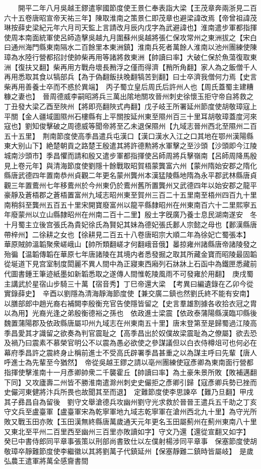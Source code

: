 　　開平二年八月吳越王鏐遣寧國節度使王景仁奉表詣大梁【王茂章奔兩浙見二百六十五卷唐昭宣帝天祐三年】陳取淮南之策景仁即茂章也避梁諱改焉【帝曾祖諱茂琳按薛史梁紀元年六月司天監上言請改月辰内戊字為武避諱也】淮南遣步軍都指揮使周本南面統軍使呂師造擊吳越九月圍蘇州吳越將張仁保攻常州之東洲拔之【宋白曰通州海門縣東南隔水二百餘里本東洲鎮】淮南兵死者萬餘人淮南以池州團練使陳璋為水陸行營都招討使帥柴再用等諸將救東洲【帥讀曰率】大破仁保於魚蕩復取東洲【復扶又翻】柴再用方戰舟壞長矟浮之僅而得濟【矟所角翻】家人為之飯僧千人再用悉取其食以犒部兵【為于偽翻飯扶晚翻犒苦到翻】曰士卒濟我僧何力焉【史言柴再用善養士卒而不惑於異端】　丙子蜀立皇后周氏后許州人也【周氏蓋蜀主建糟糠之妻也】　晉周德威李嗣昭將兵三萬出隂地關攻晉州刺史徐懷玉拒守帝自將救之丁丑發大梁乙酉至陜州【將即亮翻陜式冉翻】戊子岐王所署延州節度使胡敬璋寇上平關【金人疆域圖隰州石樓縣有上平關按延州東至隰州百三十里耳胡敬璋蓋度河來寇也】劉知俊擊破之周德威等聞帝將至乙未退保隰州【九域志晉州西北至隰州二百五十五里】　荆南節度使高季昌遣兵屯漢口【漢口漢水入江之口其地在鄂州漢陽縣東大别山下】絶楚朝貢之路楚王殷遣其將許德勲將水軍擊之至沙頭【沙頭即今江陵城南沙頭市】季昌懼而請和殷又遣步軍都指揮使呂師周將兵擊嶺南【呂師周降馬殷見上卷元年】與清海節度使劉隱十餘戰取昭賀梧蒙龔富六州【蒙州隋始安郡之隋化縣唐武德四年置南恭州貞觀二年更名蒙州龔州本漢猛陵縣地隋為永平郡武林縣唐貞觀三年置鷰州七年移鷰州於今州東仍於鷰州舊所置龔州又武德四年以始安郡之龍平豪靜及蒼梧郡之蒼梧置富州九域志昭州東至賀州三百二十五里南至梧州四百九十里南稍斜至龔州五百五十里宋開寶廢富州以龍平縣隸昭州在州東南百六十二里熙寧五年廢蒙州以立山縣隸昭州在州南二百十二里】殷土字旣廣乃養士息民湖南遂安　冬十月蜀主立後宫張氏為貴妃徐氏為賢妃其妹為德妃張氏郪人宗懿之母也【郪漢縣唐帶梓州】二徐耕之女也【徐耕見二百五十八卷唐昭宗大順二年為徐妃亡蜀張本】　華原賊帥溫韜聚衆嵯峨山【帥所類翻嵯才何翻峨音俄】㬥掠雍州諸縣唐帝諸陵發之殆徧【温韜傳韜在華原七年唐諸陵在其境内者悉發掘之取其所藏金寶而昭陵最固韜從埏道下見宫室制度閎麗不異人間中為正寢東西廂列石牀牀上石函中為鐵匣悉藏前代圖書鍾王筆迹紙墨如新韜悉取之遂傳人間惟乾陵風雨不可發雍於用翻】　庚戌蜀主講武於星宿山步騎三十萬【宿音秀】丁巳帝還大梁　【考異曰編遺錄在乙卯今從實錄薛史】　辛酉以劉隱為清海靜海節度使【兼交廣二鎮也然劉氏終不能有安南】以膳部郎中趙光裔右補闕李殷衡充官告使隱皆留之【史言羣雄割據各收拾衣冠之胄以為用】光裔光逢之弟殷衡德裕之孫也　依政進士梁震【依政泰蒲陽縣漢臨卭縣後魏置蒲陽郡及依政縣唐屬卭州九域志在州東南五十里】唐末登第至是歸蜀過江陵高季昌愛其才識留之欲奏為判官震耻之【高季昌出於奴僕故梁震耻為之僚屬】欲去恐及禍乃曰震素不慕榮官明公不以震為愚必欲使之參謀議但以白衣侍樽俎可也何必在幕府季昌許之震終身止稱前進士不受高氏辟署季昌甚重之以為謀主呼曰先輩【唐人呼進士為先輩至今猶然】　帝從吳越王鏐之請以亳州團練使寇彥卿為東南面行營都指揮使擊淮南十一月彥卿帥衆二千襲霍丘【帥讀曰率】為土豪朱景所敗【敗補邁翻下同】又攻廬壽二州皆不勝淮南遣滁州刺史史儼拒之彥卿引歸【寇彥卿兵勢已挫而史儼河東健將汴兵所畏也故聞其至而退】　定難節度使李思諫卒【難乃旦翻】甲戌其子彞昌自為留後　劉守文舉滄德兵攻幽州劉守光求救於晉晉王遣兵五千助之丁亥守文兵至盧臺軍【盧臺軍宋為乾寧軍地九域志乾寧軍在滄州西北九十里】為守光所敗又戰玉田亦敗【玉田漢無終縣唐萬歲通天元年更名玉田屬薊州在薊州東南八十里又東北至平州二百里西至幽州三百里亦敗讀如字】守文乃還【還從宣翻又如字】　癸巳中書侍郎同平章事張策以刑部尚書致仕以左僕射楊涉同平章事　保塞節度使胡敬璋卒靜難節度使李繼徽以其將劉萬子代鎮延州【保塞靜難二鎮時皆屬岐】　是歲弘農王遣軍將萬全感齎書間